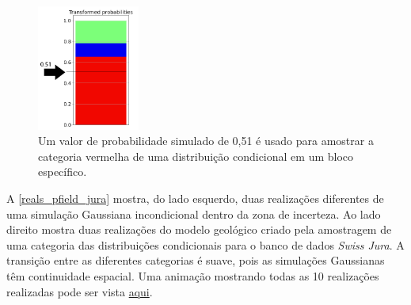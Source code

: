 \begin{figure}[H]
	\caption{\label{samplig_from_dist} Um valor de probabilidade simulado de 0,51 é usado para amostrar a categoria vermelha de uma distribuição condicional em um bloco específico.}
	\centering
		\includegraphics[width=0.3\textwidth]{capitulo_3/imagens/sampling_from_dist.png}
\end{figure}

A \autoref{reals_pfield_jura} mostra, do lado esquerdo, duas realizações diferentes de uma simulação Gaussiana incondicional dentro da zona de incerteza. Ao lado direito mostra duas realizações do modelo geológico criado pela amostragem de uma categoria das distribuições condicionais para o banco de dados \textit{Swiss Jura}. A transição entre as diferentes categorias é suave, pois as simulações Gaussianas têm continuidade espacial. Uma animação mostrando todas as 10 realizações realizadas pode ser vista \href{https://github.com/robertorolo/assessing_geological_model_uncertainty_with_probability_fields/blob/main/jura_gif.gif}{aqui}.

